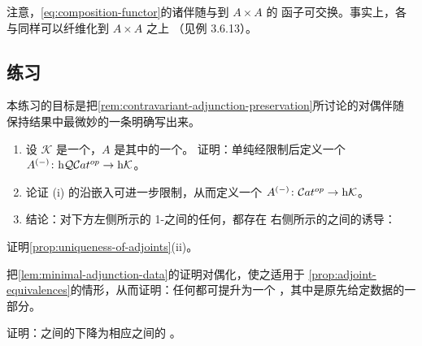 注意，\eqref{eq:composition-functor}的诸伴随\trFunctor{}与到 $A\times A$ 的%
\trEndpointEvaluation{}函子可交换。事实上，各\trUnit{}与\trCounit{}同样可以纤维化到 $A\times A$ 之上
（见例 3.6.13）。%

\subsection*{练习}

\begin{exercise}\label{ex:cotensor-2-functor}
本练习的目标是把\cref{rem:contravariant-adjunction-preservation}所讨论的对偶伴随
保持结果中最微妙的一条明确写出来。
\begin{enumerate}[label=(\roman*)]
\item 设 $\mathcal{K}$ 是一个\trInfinityCosmos{}，$A$ 是其中的一个\trInfinityCategory{}。
  证明：单纯\trCotensor{}经限制后定义一个\trTwoFunctor
  $A^{(-)}\colon\mathrm{h}\mathcal{Q}\mathcal{C}at^{op}\to\mathrm{h}\mathcal{K}$。
\item 论证 (i) 的\trTwoFunctor{}沿\trNerve{}嵌入可进一步限制，从而定义一个%
  \trTwoFunctor{} $A^{(-)}\colon\mathcal{C}at^{op}\to\mathrm{h}\mathcal{K}$。
\item 结论：对下方左侧所示的 1-\trCategory{}之间的任何\trAdjunction{}，都存在
  右侧所示的\trInfinityCategory{}之间的诱导\trAdjunction{}：
\begin{center}
\end{center}
\end{enumerate}
\end{exercise}

\begin{exercise}\label{ex:uniqueness-converse}
证明\cref{prop:uniqueness-of-adjoints}(ii)。
\end{exercise}

\begin{exercise}\label{ex:dual-minimal-data}
把\cref{lem:minimal-adjunction-data}的证明对偶化，使之适用于
\cref{prop:adjoint-equivalences}的情形，从而证明：任何\trEquivalence{}都可提升为一个%
\trAdjointEquivalence{}，其中\trCounit{}是原先给定数据的一部分。
\end{exercise}

\begin{exercise}\label{ex:adjoint-equivalence-homotopy-category}
证明：\trInfinityCategory{}之间的\trAdjointEquivalence{}下降为相应\trHomotopyCategory{}之间的%
\trAdjointEquivalence{}。
\end{exercise}
